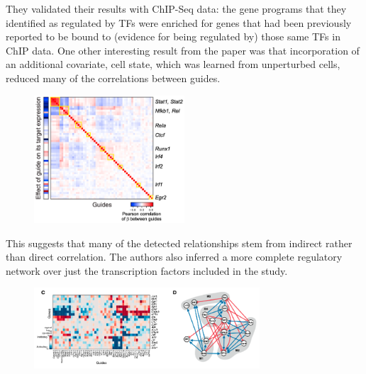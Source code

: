 \documentclass[letterpaper, 11pt]{article}
\begin{document}
They validated their results with ChIP-Seq data: the gene programs that they identified as regulated by TFs were enriched for genes that had been previously reported to be bound to (evidence for being regulated by) those same TFs in ChIP data. One other interesting result from the paper was that incorporation of an additional covariate, cell state, which was learned from unperturbed cells, reduced many of the correlations between guides.
\begin{figure}[H]
\centering
\includegraphics[width=0.5\textwidth]{ct_guide_hm.png}
\end{figure}
This suggests that many of the detected relationships stem from indirect rather than direct correlation. The authors also inferred a more complete regulatory network over just the transcription factors included in the study.
\begin{figure}[H]
\centering
\includegraphics[width=0.75\textwidth]{tf_net.png}
\end{figure}
\end{document}
